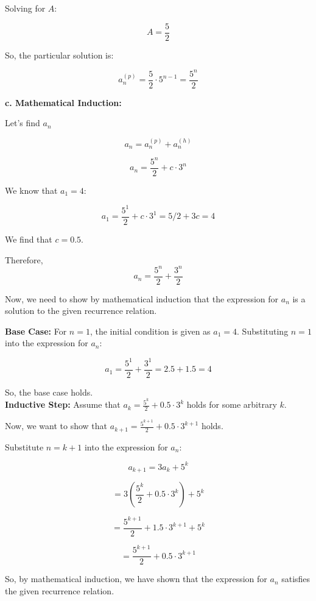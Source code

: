 \documentclass[12pt]{article}
\begin{document}
Solving for \(A\):

\[A = \frac{5}{2}\]

So, the particular solution is:

\[a_n^{(p)} = \frac{5}{2} \cdot 5^{n-1} = \frac{5^n}{2}\]

\textbf{c. Mathematical Induction:}

Let's find \(a_n\)

\[a_n = a_n^{(p)} + a_n^{(h)} \]

\[a_n = \frac{5^n}{2} + c \cdot 3^n \]

We know that \(a_1 = 4\):

\[a_1 = \frac{5^1}{2} + c \cdot 3^1 = 5/2 + 3c = 4\]

We find that \(c=0.5\).

Therefore, \[a_n = \frac{5^n}{2} + \frac{3^n}{2} \]

Now, we need to show by mathematical induction that the expression for \(a_n\) is a solution to the given recurrence relation.

\textbf{Base Case:}
For \(n = 1\), the initial condition is given as \(a_1 = 4\). Substituting \(n = 1\) into the expression for \(a_n\):

\[a_1 = \frac{5^1}{2} + \frac{3^1}{2} = 2.5 + 1.5 = 4\]

So, the base case holds. \\

\textbf{Inductive Step:}
Assume that \(a_k = \frac{5^k}{2} + 0.5 \cdot 3^k\) holds for some arbitrary \(k\).

Now, we want to show that \(a_{k+1} = \frac{5^{k+1}}{2} + 0.5 \cdot 3^{k+1}\) holds.

Substitute \(n = k+1\) into the expression for \(a_n\):

\[a_{k+1} = 3a_k + 5^k\]

\[= 3\left(\frac{5^k}{2} + 0.5 \cdot 3^k\right) + 5^k\]

\[= \frac{5^{k+1}}{2} + 1.5 \cdot 3^{k+1} + 5^k\]

\[= \frac{5^{k+1}}{2} + 0.5 \cdot 3^{k+1}\]

So, by mathematical induction, we have shown that the expression for \(a_n\) satisfies the given recurrence relation.
\end{document}
